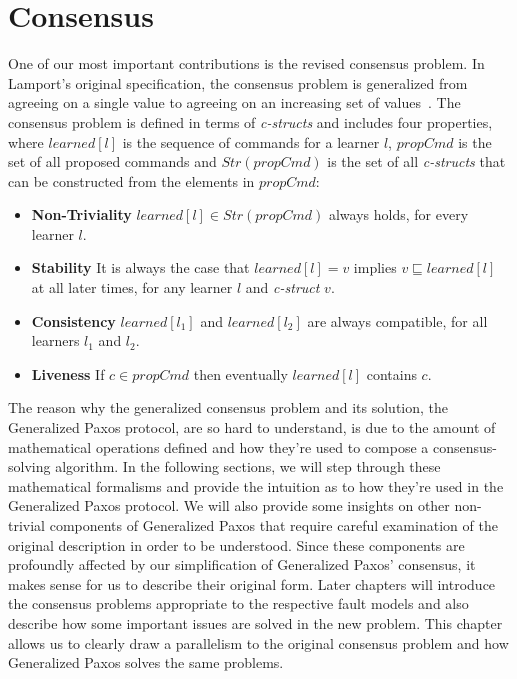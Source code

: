 \chapter{Consensus}

One of our most important contributions is the revised consensus problem. In Lamport's original specification, the consensus problem is generalized from agreeing on a single value to agreeing on an increasing set of values~\cite{Lamport2005}. The consensus problem is defined in terms of \textit{c-structs} and includes four properties, where $learned[l]$ is the sequence of commands for a learner $l$, $propCmd$ is the set of all proposed commands and $Str(propCmd)$ is the set of all \textit{c-structs} that can be constructed from the elements in $propCmd$:
\begin{itemize}
	\item \textbf{Non-Triviality} $learned[l] \in Str(propCmd)$ always holds, for every learner $l$.
	\item \textbf{Stability} It is always the case that $learned[l] = v$ implies $v \sqsubseteq learned[l]$ at all later times, for any learner $l$ and \textit{c-struct} $v$.
	\item \textbf{Consistency} $learned[l_1]$ and $learned[l_2]$ are always compatible, for all learners $l_1$ and $l_2$.
	\item \textbf{Liveness} If $c \in propCmd$ then eventually $learned[l]$ contains $c$.
\end{itemize}

\par
The reason why the generalized consensus problem and its solution, the Generalized Paxos protocol, are so hard to understand, is due to the amount of mathematical operations defined and how they're used to compose a consensus-solving algorithm. In the following sections, we will step through these mathematical formalisms and provide the intuition as to how they're used in the Generalized Paxos protocol. {\color{red}We will also provide some insights on other non-trivial components of Generalized Paxos that require careful examination of the original description in order to be understood. Since these components are profoundly affected by our simplification of Generalized Paxos' consensus, it makes sense for us to describe their original form. Later chapters will introduce the consensus problems appropriate to the respective fault models and also describe how some important issues are solved in the new problem. This chapter allows us to clearly draw a parallelism to the original consensus problem and how Generalized Paxos solves the same problems.}

